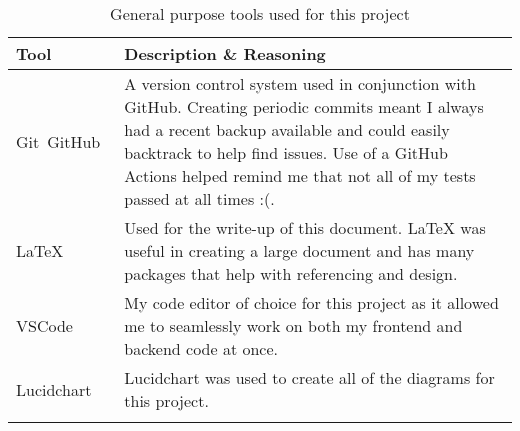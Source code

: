 \begin{longtable}{p{} p{}}
  \toprule
  \textbf{Tool} & \textbf{Description \& Reasoning}
  \\\midrule\midrule
  Git~\cite{noauthor_git_nodate}\newline GitHub~\cite{noauthor_github_nodate}
  & A version control system used in conjunction with GitHub. Creating periodic commits meant I always had a recent backup available and could easily backtrack to help find issues.
  Use of a GitHub Actions helped remind me that not all of my tests passed at all times :(.\\
  LaTeX~\cite{noauthor_latex_nodate}
  & Used for the write-up of this document. LaTeX was useful in creating a large document and has many packages that help with referencing and design.\\
  VSCode~\cite{noauthor_visual_nodate}
  & My code editor of choice for this project as it allowed me to seamlessly work on both my frontend and backend code at once.\\
  Lucidchart~\cite{noauthor_lucidchart_nodate}
  & Lucidchart was used to create all of the diagrams for this project.
  \\\bottomrule\bottomrule
  \caption{General purpose tools used for this project}
\end{longtable}
